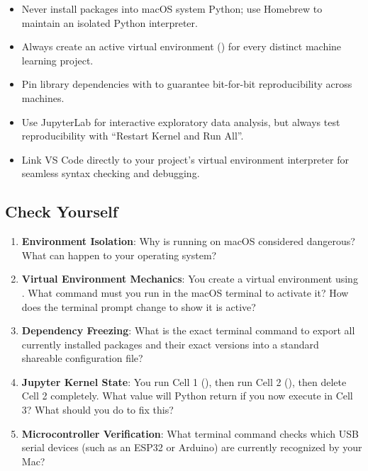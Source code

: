 \begin{takeaways}
\begin{itemize}
    \item Never install packages into macOS system Python; use Homebrew to maintain an isolated Python interpreter.
    \item Always create an active virtual environment () for every distinct machine learning project.
    \item Pin library dependencies with  to guarantee bit-for-bit reproducibility across machines.
    \item Use JupyterLab for interactive exploratory data analysis, but always test reproducibility with ``Restart Kernel and Run All''.
    \item Link VS Code directly to your project's virtual environment interpreter for seamless syntax checking and debugging.
\end{itemize}
\end{takeaways}

\subsection{Check Yourself}

\begin{enumerate}
    \item \textbf{Environment Isolation}: Why is running  on macOS considered dangerous? What can happen to your operating system?

    \item \textbf{Virtual Environment Mechanics}: You create a virtual environment using . What command must you run in the macOS terminal to activate it? How does the terminal prompt change to show it is active?

    \item \textbf{Dependency Freezing}: What is the exact terminal command to export all currently installed packages and their exact versions into a standard shareable configuration file?

    \item \textbf{Jupyter Kernel State}: You run Cell 1 (), then run Cell 2 (), then delete Cell 2 completely. What value will Python return if you now execute  in Cell 3? What should you do to fix this?

    \item \textbf{Microcontroller Verification}: What terminal command checks which USB serial devices (such as an ESP32 or Arduino) are currently recognized by your Mac?
\end{enumerate}

